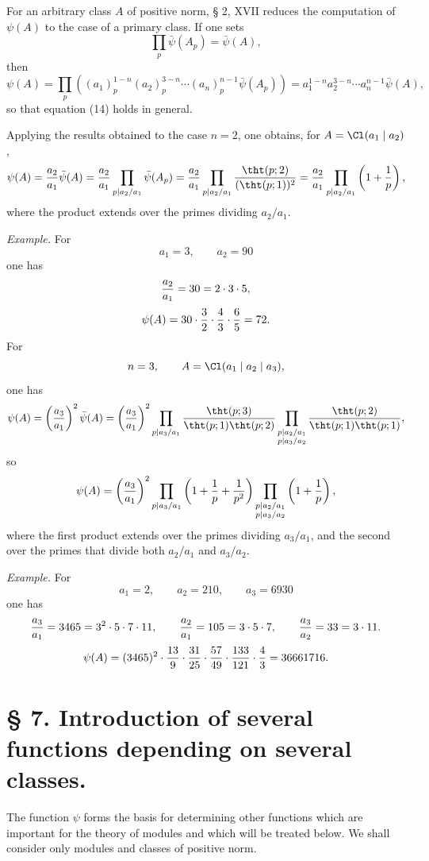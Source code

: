 For an arbitrary class $A$ of positive norm, § 2, XVII reduces the computation of $\psi(A)$ to the case of a primary class. If one sets
\[
 \prod_p\bar\psi(A_p)=\bar\psi(A),
\]
then
\[
 \psi(A)=\prod_p\left((a_1)_p^{1-n}(a_2)_p^{3-n}\cdots(a_n)_p^{n-1}\bar\psi(A_p)\right)
 =a_1^{1-n}a_2^{3-n}\cdots a_n^{n-1}\bar\psi(A),
\]
so that equation (14) holds in general.

Applying the results obtained to the case $n=2$, one obtains, for $A=\Cl(a_1\mid a_2)$,
\[
 \psi(A)={a_2\over a_1}\bar\psi(A)
 ={a_2\over a_1}\prod_{p\mid a_2/a_1}\bar\psi(A_p)
 ={a_2\over a_1}\prod_{p\mid a_2/a_1}{\tht(p;2)\over(\tht(p;1))^2}
 ={a_2\over a_1}\prod_{p\mid a_2/a_1}\left(1+{1\over p}\right),
\]
where the product extends over the primes dividing $a_2/a_1$.

\emph{Example.} For
\[
 a_1=3,\qquad a_2=90
\]
one has
\[
 {a_2\over a_1}=30=2\cdot3\cdot5,
\]
\[
 \psi(A)=30\cdot {3\over2}\cdot {4\over3}\cdot {6\over5}=72.
\]
For
\[
 n=3,
 \qquad A=\Cl(a_1\mid a_2\mid a_3),
\]
one has
\[
 \psi(A)=\left({a_3\over a_1}\right)^2\bar\psi(A)
 =\left({a_3\over a_1}\right)^2
 \prod_{p\mid a_3/a_1}{\tht(p;3)\over\tht(p;1)\tht(p;2)}
 \prod_{\substack{p\mid a_2/a_1\\ p\mid a_3/a_2}}
 {\tht(p;2)\over\tht(p;1)\tht(p;1)},
\]
so
\[
 \psi(A)=\left({a_3\over a_1}\right)^2
 \prod_{p\mid a_3/a_1}\left(1+{1\over p}+{1\over p^2}\right)
 \prod_{\substack{p\mid a_2/a_1\\ p\mid a_3/a_2}}
 \left(1+{1\over p}\right),
\]
where the first product extends over the primes dividing $a_3/a_1$, and the second over the primes that divide both $a_2/a_1$ and $a_3/a_2$.

\emph{Example.} For
\[
 a_1=2,\qquad a_2=210,\qquad a_3=6930
\]
one has
\[
 {a_3\over a_1}=3465=3^2\cdot5\cdot7\cdot11,
 \qquad {a_2\over a_1}=105=3\cdot5\cdot7,
 \qquad {a_3\over a_2}=33=3\cdot11.
\]
\[
 \psi(A)=(3465)^2\cdot {13\over9}\cdot {31\over25}\cdot {57\over49}\cdot {133\over121}\cdot {4\over3}=36661716.
\]

\section*{§ 7. Introduction of several functions depending on several classes.}

The function $\psi$ forms the basis for determining other functions which are important for the theory of modules and which will be treated below. We shall consider only modules and classes of positive norm.

